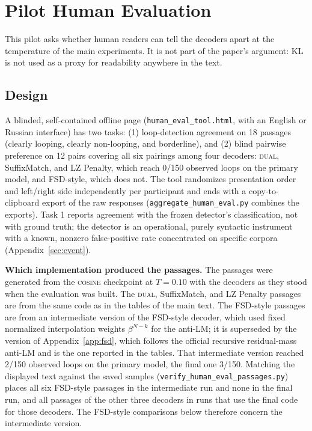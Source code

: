 \section{Pilot Human Evaluation}
\label{sec:human-eval}

This pilot asks whether human readers can tell the decoders apart at the temperature of the main experiments. It is not part of the paper's argument: KL is not used as a proxy for readability anywhere in the text.

\subsection{Design}
A blinded, self-contained offline page (\texttt{human\_\allowbreak{}eval\_\allowbreak{}tool.html}, with an English or Russian interface) has two tasks: (1) loop-detection agreement on 18 passages (clearly looping, clearly non-looping, and borderline), and (2) blind pairwise preference on 12 pairs covering all six pairings among four decoders: \textsc{dual}, SuffixMatch, and LZ Penalty, which reach 0/150 observed loops on the primary model, and FSD-style, which does not. The tool randomizes presentation order and left/right side independently per participant and ends with a copy-to-clipboard export of the raw responses (\texttt{aggregate\_\allowbreak{}human\_\allowbreak{}eval.py} combines the exports). Task 1 reports agreement with the frozen detector's classification, not with ground truth: the detector is an operational, purely syntactic instrument with a known, nonzero false-positive rate concentrated on specific corpora (Appendix~\ref{sec:event}).

\textbf{Which implementation produced the passages.} The passages were generated from the \textsc{cosine} checkpoint at $T{=}0.10$ with the decoders as they stood when the evaluation was built. The \textsc{dual}, SuffixMatch, and LZ Penalty passages are from the same code as in the tables of the main text. The FSD-style passages are from an intermediate version of the FSD-style decoder, which used fixed normalized interpolation weights $\beta^{N-k}$ for the anti-LM; it is superseded by the version of Appendix~\ref{app:fsd}, which follows the official recursive residual-mass anti-LM and is the one reported in the tables. That intermediate version reached 2/150 observed loops on the primary model, the final one 3/150. Matching the displayed text against the saved samples (\texttt{verify\_\allowbreak{}human\_\allowbreak{}eval\_\allowbreak{}passages.py}) places all six FSD-style passages in the intermediate run and none in the final run, and all passages of the other three decoders in runs that use the final code for those decoders. The FSD-style comparisons below therefore concern the intermediate version.

